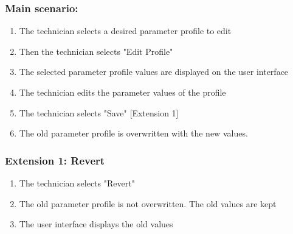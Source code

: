 \begin{framed}
\subsubsection*{Main scenario:}
\begin{enumerate}
	\item The technician selects a desired parameter profile to edit
	\item Then the technician selects "Edit Profile"
	\item The selected parameter profile values are displayed on the user interface
	\item The technician edits the parameter values of the profile
	\item The technician selects "Save" [Extension 1]
	\item The old parameter profile is overwritten with the new values.
\end{enumerate}	

\subsubsection*{Extension 1: Revert}
	\begin{enumerate}
		\item The technician selects "Revert"
		\item The old parameter profile is not overwritten. The old values are kept
		\item The user interface displays the old values
	\end{enumerate}
\end{framed}

